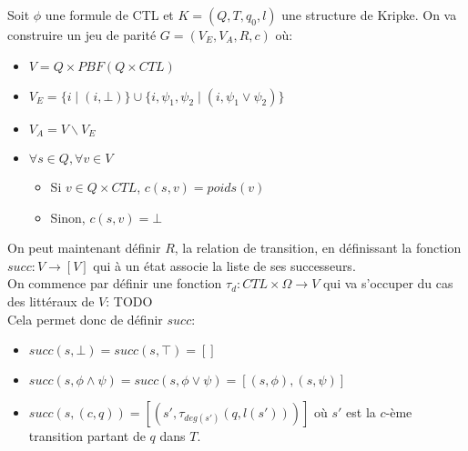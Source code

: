\documentclass[10pt,a4paper]{article}
\begin{document}
Soit $\phi$ une formule de CTL et $K = (Q,T,q_0,l)$  une structure de Kripke.
On va construire un jeu de parité $G = (V_E,V_A,R,c)$ où:
\begin{itemize}
	\item $V = Q \times PBF(Q \times CTL) $ %
	\item $V_E = \{i \mid (i, \bot )\} \cup \{i, \psi_1, \psi_2 \mid (i, \psi_1 \lor \psi_2) \}$
	\item $V_A = V \backslash V_E$
	\item $\forall s \in Q, \forall v \in V$
	\begin{itemize}
		\item Si $v \in Q \times CTL$, $c(s,v) = poids(v)$
		\item Sinon, $c(s,v) = \bot$  %
	\end{itemize}
\end{itemize}

On peut maintenant définir $R$, la relation de transition, en définissant la fonction $succ : V \to [V]$ qui à un état associe la liste de ses successeurs.\\

On commence par définir une fonction $\tau_d : CTL \times \Omega \to V$ qui va s'occuper du cas des littéraux de $V$: TODO\\

Cela permet donc de définir $succ$:
\begin{itemize}
\item$ succ(s, \bot) = succ(s, \top) = []$
\item $succ(s,\phi \land \psi) = succ(s, \phi \lor \psi) = [(s,\phi), (s,\psi)]$
\item $succ(s,(c,q)) = [(s', \tau_{deg (s')}(q, l(s')))]$ où $s'$ est la $c$-ème transition partant de $q$ dans $T$.
\end{itemize}
\end{document}
